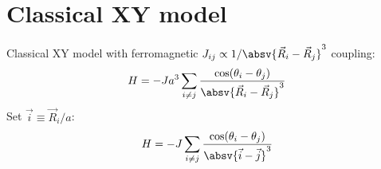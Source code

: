 \chapter{Classical XY model}
\label{xy_model}

\newcommand{\Raij}{\absv{\vec{R}_i-\vec{R}_j}^3}
\newcommand{\aij}{\absv{\vec{i}-\vec{j}}^3}
\newcommand{\suminj}{\sum_{i\ne j}}

Classical XY model with ferromagnetic $J_{ij} \propto 1/\Raij$ coupling:
\begin{align}
H=-J a^3 \sum_{i\ne j} \frac{\cos(\theta_i - \theta_j)}{\Raij}
\end{align}
Set $\vec{i}\equiv \vec{R}_i/a$:
\begin{align}
H=-J \sum_{i\ne j} \frac{\cos(\theta_i - \theta_j)}{\aij}
\end{align}

